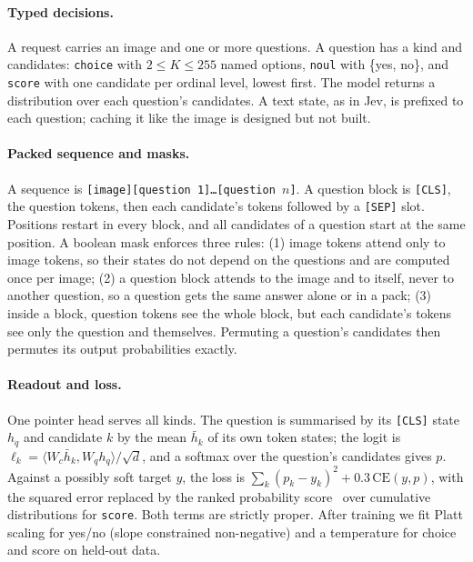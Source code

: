 \documentclass[10pt]{article}
\begin{document}
\paragraph{Typed decisions.} A request carries an image and one or more questions. A question has a kind and candidates: \texttt{choice} with $2\le K\le 255$ named options, \texttt{noul} with \{yes, no\}, and \texttt{score} with one candidate per ordinal level, lowest first. The model returns a distribution over each question's candidates. A text state, as in Jev, is prefixed to each question; caching it like the image is designed but not built.

\paragraph{Packed sequence and masks.} A sequence is \texttt{[image][question 1]\dots[question $n$]}. A question block is \texttt{[CLS]}, the question tokens, then each candidate's tokens followed by a \texttt{[SEP]} slot. Positions restart in every block, and all candidates of a question start at the same position. A boolean mask enforces three rules: (1) image tokens attend only to image tokens, so their states do not depend on the questions and are computed once per image; (2) a question block attends to the image and to itself, never to another question, so a question gets the same answer alone or in a pack; (3) inside a block, question tokens see the whole block, but each candidate's tokens see only the question and themselves. Permuting a question's candidates then permutes its output probabilities exactly.

\paragraph{Readout and loss.} One pointer head serves all kinds. The question is summarised by its \texttt{[CLS]} state $h_q$ and candidate $k$ by the mean $\bar h_k$ of its own token states; the logit is $\ell_k = \langle W_c \bar h_k, W_q h_q\rangle/\sqrt{d}$, and a softmax over the question's candidates gives $p$. Against a possibly soft target $y$, the loss is $\sum_k (p_k - y_k)^2 + 0.3\,\mathrm{CE}(y,p)$, with the squared error replaced by the ranked probability score~\cite{epstein1969} over cumulative distributions for \texttt{score}. Both terms are strictly proper. After training we fit Platt scaling for yes/no (slope constrained non-negative) and a temperature for choice and score on held-out data.
\end{document}
